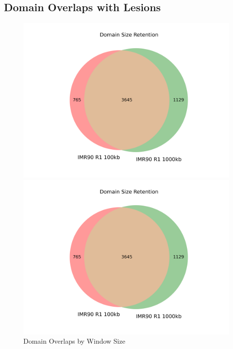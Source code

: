 \newpage

\subsection*{Domain Overlaps with Lesions}

\begin{figure}[thp]
  \centering
  \caption{Domain Overlaps by Window Size}
  \begin{minipage}{0.45\textwidth}%
    \centering
    \includegraphics[width=\textwidth]{./figures/supplementary/domains/venn2_ir1_100kb_vs_ir1_1000kb.png}
  \end{minipage}

  \hfill

  \begin{minipage}{0.45\textwidth}
    \centering
    \includegraphics[width=\textwidth]{./figures/supplementary/domains/venn2_ir1_100kb_vs_ir1_1000kb.png}
  \end{minipage}
\end{figure}
